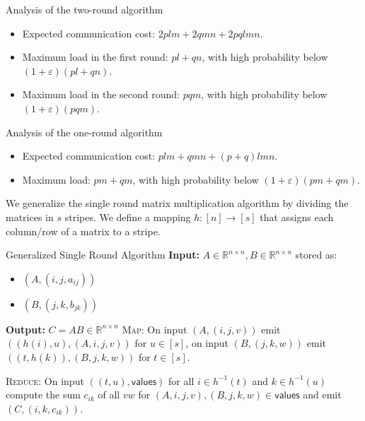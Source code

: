 \documentclass[english]{panikzettel}
\begin{document}
\begin{theo}{Analysis of the two-round algorithm}
\begin{itemize}[leftmargin=*]
	\item Expected communication cost: $2plm + 2qmn + 2pqlmn$.
	\item Maximum load in the first round: $pl + qn$, with high probability below $(1 + \varepsilon)(pl + qn)$.
	\item Maximum load in the second round: $pqm$, with high probability below $(1 + \varepsilon)(pqm)$.
\end{itemize}
\end{theo}

\begin{theo}{Analysis of the one-round algorithm}
\begin{itemize}[leftmargin=*]
	\item Expected communication cost: $plm + qmn + (p+q)lmn$.
	\item Maximum load: $pm + qm$, with high probability below $(1 + \varepsilon)(pm + qm)$.
\end{itemize}
\end{theo}

We generalize the single round matrix multiplication algorithm by dividing the matrices in $s$ stripes.
We define a mapping $h: [n] \rightarrow [s]$ that assigns each column/row of a matrix to a stripe.

\begin{algo}{Generalized Single Round Algorithm}
\textbf{Input:} $A \in \mathbb{R}^{n \times n}, B \in \mathbb{R}^{n \times n}$ stored as:
\begin{itemize}
	\item $(A,(i,j,a_{ij}))$
	\item $(B,(j,k,b_{jk}))$
\end{itemize}

\textbf{Output:} $C = AB \in \mathbb{R}^{n \times n}$
\tcblower
\textsc{Map}: On input $(A,(i,j,v))$ emit $((h(i),u),(A,i,j,v))$ for $u \in [s]$, on input $(B,(j,k,w))$ emit $((t,h(k)),(B,j,k,w))$ for $t \in [s]$.

\textsc{Reduce}: On input $((t,u), \textsf{values})$ for all $i \in h^{-1}(t)$ and $k \in h^{-1}(u)$ compute the sum $c_{ik}$ of all $vw$ for $(A,i,j,v),(B,j,k,w) \in \textsf{values}$ and emit $(C,(i,k,c_{ik}))$.
\end{algo}
\end{document}

